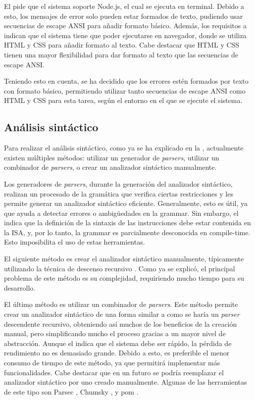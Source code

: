 El  pide que el sistema soporte Node.js, el cual se ejecuta
en terminal. Debido a esto, los mensajes de error solo pueden estar formados de
texto, pudiendo usar secuencias de escape ANSI \parencite{ANSIEscapeSequences}
para añadir formato básico. Además, los requisitos  a
 indican que el sistema tiene que poder ejecutarse en
navegador, donde se utiliza \gls{HTML} y \gls{CSS} para añadir formato al texto.
Cabe destacar que \gls{HTML} y \gls{CSS} tienen una mayor flexibilidad para dar
formato al texto que las secuencias de escape ANSI.

Teniendo esto en cuenta, se ha decidido que los errores estén formados por texto
con formato básico, permitiendo utilizar tanto secuencias de escape ANSI como
\gls{HTML} y \gls{CSS} para esta tarea, según el entorno en el que se ejecute el
sistema.

\subsection{Análisis sintáctico}\label{subsec:parser}

Para realizar el análisis sintáctico, como ya se ha explicado en la
, actualmente existen múltiples métodos: utilizar
un generador de \textit{\glspl{parser}}, utilizar un combinador de
\textit{\glspl{parser}}, o crear un analizador sintáctico manualmente.
\parencite{dragon-book} \parencite{parser-combinators}

Los generadores de \textit{\glspl{parser}}, durante la generación del analizador
sintáctico, realizan un procesado de la gramática que verifica ciertas
restricciones y les permite generar un analizador sintáctico eficiente.
Generalmente, esto es útil, ya que ayuda a detectar errores o ambigüedades en la
\gls{grammar}. Sin embargo, el  indica que la
definición de la sintaxis de las instrucciones debe estar contenida en la
\gls{ISA}, y, por lo tanto, la \gls{grammar} es parcialmente desconocida en
\gls{compile-time}. Esto imposibilita el uso de estas herramientas.

El siguiente método es crear el analizador sintáctico manualmente, típicamente
utilizando la técnica de descenso recursivo \parencite{dragon-book}. Como ya se
explicó, el principal problema de este método es su complejidad, requiriendo
mucho tiempo para su desarrollo.

El último método es utilizar un combinador de \textit{\glspl{parser}}. Este
método permite crear un analizador sintáctico de una forma similar a como se
haría un \textit{\gls{parser}} descendente recursivo, obteniendo así muchos de
los beneficios de la creación manual, pero simplificando mucho el proceso
gracias a un mayor nivel de abstracción. Aunque el  indica
que el sistema debe ser rápido, la pérdida de rendimiento no es demasiado
grande. Debido a esto, es preferible el menor consumo de tiempo de este método,
ya que permitirá implementar más funcionalidades. Cabe destacar que en un futuro
se podría reemplazar el analizador sintáctico por uno creado manualmente.
Algunas de las herramientas de este tipo son Parsec \parencite{parsec}, Chumsky
\parencite{chumsky}, y pom \parencite{pom}.

